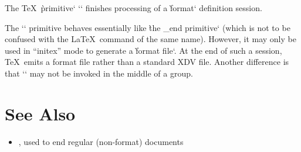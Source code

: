 
The \TeX\ \`primitive` \tex`\dump` finishes processing of a \`format` definition
session.

The \tex`\dump` primitive behaves essentially like \`the _end primitive` (which
is not to be confused with the \LaTeX\ command of the same name). However, it
may only be used in “initex” mode to generate a \`format file`. At the end of
such a session, \TeX\ emits a format file rather than a standard XDV file.
Another difference is that \tex`\dump` may not be invoked in the middle of a
group.

\section*{See Also}

\begin{itemize}
\item {}, used to end regular (non-format) documents
\end{itemize}
